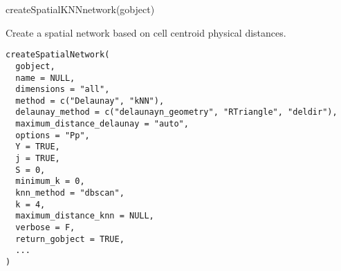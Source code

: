 \documentclass[a4paper]{book}
\begin{document}
%
\begin{Examples}
\begin{ExampleCode}
    createSpatialKNNnetwork(gobject)
\end{ExampleCode}
\end{Examples}
%
\begin{Description}\relax
Create a spatial network based on cell centroid physical distances.
\end{Description}
%
\begin{Usage}
\begin{verbatim}
createSpatialNetwork(
  gobject,
  name = NULL,
  dimensions = "all",
  method = c("Delaunay", "kNN"),
  delaunay_method = c("delaunayn_geometry", "RTriangle", "deldir"),
  maximum_distance_delaunay = "auto",
  options = "Pp",
  Y = TRUE,
  j = TRUE,
  S = 0,
  minimum_k = 0,
  knn_method = "dbscan",
  k = 4,
  maximum_distance_knn = NULL,
  verbose = F,
  return_gobject = TRUE,
  ...
)
\end{verbatim}
\end{Usage}
%
\end{document}
